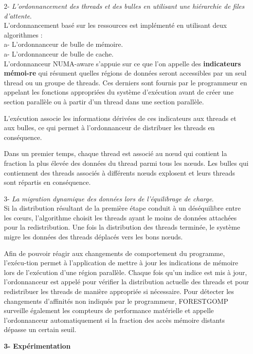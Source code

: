 2- \textit{L'ordonnancement des threads et des bulles en utilisant une hiérarchie de files d'attente}.\\
L'ordonnancement basé sur les ressources est implémenté en utilisant deux algorithmes : \\
a- L'ordonnanceur de bulle de mémoire.\\
a- L'ordonnanceur de bulle de cache. \\

L'ordonnanceur NUMA-aware s'appuie sur ce que l'on appelle des \textbf{indicateurs mémoi-re} qui résument quelles régions de données seront accessibles par un seul thread ou un groupe de threads. Ces derniers sont fournis par le programmeur en appelant les fonctions appropriées du système d'exécution avant de créer une section parallèle ou à partir d'un thread dans une section parallèle.

L'exécution associe les informations dérivées de ces indicateurs aux threads et aux bulles, ce qui permet à l'ordonnanceur de distribuer les threads en conséquence. 

Dans un premier temps, chaque thread est associé au nœud qui contient la fraction la plus élevée des données du thread parmi tous les nœuds. 
Les bulles qui contiennent des threads associés à différents nœuds explosent et leurs threads sont répartis en conséquence. 

3- \textit{La migration dynamique des données lors de l'équilibrage de charge}.\\
Si la distribution résultant de la première étape conduit à un déséquilibre entre les cœurs, 
l'algorithme choisit les threads ayant le moins de données attachées pour la redistribution. 
Une fois la distribution des threads terminée, le système migre les données des threads déplacés vers les bons nœuds. 

Afin de pouvoir réagir aux changements de comportement du programme, l'exécu-tion permet à l'application de mettre à jour les indications de mémoire lors de l'exécution d'une région parallèle. 
Chaque fois qu'un indice est mis à jour, l'ordonnanceur est appelé pour vérifier la distribution actuelle des threads et pour redistribuer les threads de manière appropriée si nécessaire. 
Pour détecter les changements d'affinités non indiqués par le programmeur, FORESTGOMP surveille également les compteurs de performance matérielle et appelle l'ordonnanceur automatiquement si la fraction des accès mémoire distants dépasse un certain seuil.

\textbf{3- Expérimentation}

